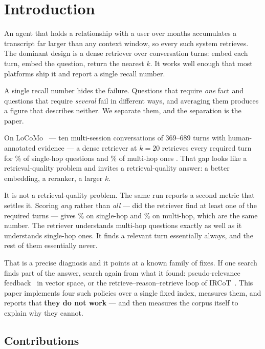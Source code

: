 \section{Introduction}
\label{sec:intro}

An agent that holds a relationship with a user over months accumulates a
transcript far larger than any context window, so every such system retrieves.
The dominant design is a dense retriever over conversation turns: embed each
turn, embed the question, return the nearest $k$. It works well enough that most
platforms ship it and report a single recall number.

A single recall number hides the failure. Questions that require \emph{one} fact
and questions that require \emph{several} fail in different ways, and averaging
them produces a figure that describes neither. We separate them, and the
separation is the paper.

On LoCoMo~\cite{locomo} --- ten multi-session conversations of 369--689 turns
with human-annotated evidence --- a dense retriever at $k{=}20$ retrieves every
required turn for \rSallTwenty{}\% of single-hop questions and \rMallTwenty{}\%
of multi-hop ones \meas{}. That gap looks like a retrieval-quality problem and
invites a retrieval-quality answer: a better embedding, a reranker, a larger $k$.

It is not a retrieval-quality problem. The same run reports a second metric that
settles it. Scoring \emph{any} rather than \emph{all} --- did the retriever find
at least one of the required turns --- gives \rSanyTwenty{}\% on single-hop and
\rManyTwenty{}\% on multi-hop, which are the same number. The retriever
understands multi-hop questions exactly as well as it understands single-hop
ones. It finds a relevant turn essentially always, and the rest of them
essentially never.

That is a precise diagnosis and it points at a known family of fixes. If one
search finds part of the answer, search again from what it found: pseudo-relevance
feedback~\cite{rocchio} in vector space, or the retrieve--reason--retrieve loop
of IRCoT~\cite{ircot}. This paper implements four such policies over a single
fixed index, measures them, and reports that \textbf{they do not work} --- and
then measures the corpus itself to explain why they cannot.

\subsection*{Contributions}


